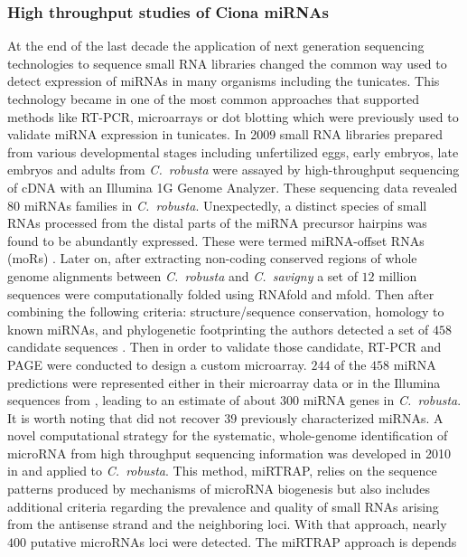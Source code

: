 \documentclass[graybox]{svmult}
\begin{document}
\subsubsection{High throughput studies of Ciona miRNAs} 

At the end of the last decade the application of next generation sequencing
technologies to sequence small RNA libraries changed the common way used to
detect expression of miRNAs in many organisms including the tunicates. This
technology became in one of the most common approaches that supported
methods like RT-PCR, microarrays or dot blotting which were previously used
to validate miRNA expression in tunicates. In 2009 small RNA libraries
prepared from various developmental stages including unfertilized eggs,
early embryos, late embryos and adults from \textit{C.\ robusta} were
assayed by high-throughput sequencing of cDNA with an Illumina 1G Genome
Analyzer. These sequencing data revealed $80$ miRNAs families in
\textit{C.\ robusta}.  Unexpectedly, a distinct species of small RNAs
processed from the distal parts of the miRNA precursor hairpins was found
to be abundantly expressed. These were termed miRNA-offset RNAs (moRs)
\cite{Shi2009}.  Later on, after extracting non-coding conserved regions of
whole genome alignments between \textit{C.\ robusta} and \textit{C.\
  savigny} a set of $12$ million sequences were computationally folded
using RNAfold and mfold. Then after combining the following criteria:
structure/sequence conservation, homology to known miRNAs, and phylogenetic
footprinting the authors detected a set of $458$ candidate sequences
\cite{Keshavan2010}. Then in order to validate those candidate, RT-PCR and
PAGE were conducted to design a custom microarray.  $244$ of the $458$
miRNA predictions were represented either in their microarray data or in
the Illumina sequences from \cite{Shi2009}, leading to an estimate of about
$300$ miRNA genes in \textit{C.\ robusta}. It is worth noting that
\cite{Keshavan2010} did not recover $39$ previously characterized miRNAs.
A novel computational strategy for the systematic, whole-genome
identification of microRNA from high throughput sequencing information was
developed in 2010 in \cite{Hendrix2010} and applied to \textit{C.\
  robusta}. This method, miRTRAP, relies on the sequence patterns produced
by mechanisms of microRNA biogenesis but also includes additional criteria
regarding the prevalence and quality of small RNAs arising from the
antisense strand and the neighboring loci. With that approach, nearly $400$
putative microRNAs loci were detected. The miRTRAP approach is depends
\end{document}
